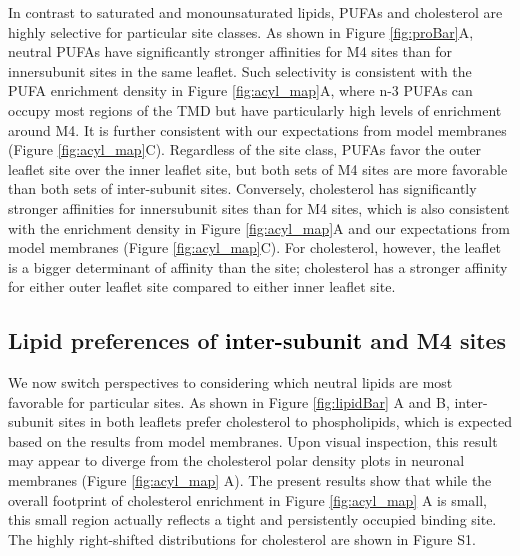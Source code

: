 \documentclass[%
 aip,
 amsmath,amssymb,
 preprint,%
]{revtex4-1}\usepackage{setspace}
\newcommand{\liam}[1]{\textcolor{black}{#1}}
\newcommand{\grace}[1]{\textcolor{black}{{#1}}}
\begin{document}
In contrast to saturated and monounsaturated lipids, PUFAs and cholesterol are highly selective for particular site classes.  As shown in Figure  \ref{fig:proBar}A, neutral PUFAs have significantly stronger affinities for M4 sites than for innersubunit sites in the same leaflet.  Such selectivity is consistent with the PUFA enrichment density in Figure \ref{fig:acyl_map}A, where n-3 PUFAs can occupy most regions of the TMD but have particularly high levels of enrichment around M4. It is further consistent with our expectations from model membranes (Figure \ref{fig:acyl_map}C). Regardless of the site class, PUFAs favor the outer leaflet site over the inner leaflet site, but both sets of M4 sites are more favorable than both sets of inter-subunit sites.  Conversely, cholesterol has significantly stronger affinities for innersubunit sites than for M4 sites, which is also consistent with the enrichment density in Figure \ref{fig:acyl_map}A and our expectations from model membranes (Figure \ref{fig:acyl_map}C). For cholesterol, however, the leaflet is a bigger determinant of affinity than the site; cholesterol has a stronger affinity for either outer leaflet site compared to either inner leaflet site.  

\subsection{Lipid preferences of  \liam{inter-subunit} and M4 sites}
We now switch perspectives to considering which neutral lipids are most favorable for particular sites. As shown in Figure \ref{fig:lipidBar} A and B, inter-subunit sites in both leaflets prefer cholesterol to phospholipids, which is expected based on the results from model membranes.  Upon visual inspection, this result may appear to diverge from the cholesterol polar density plots in neuronal membranes (Figure \ref{fig:acyl_map} A).  The present results show that while the overall footprint of cholesterol enrichment in Figure \ref{fig:acyl_map} A is small, this small region actually reflects a tight and persistently occupied binding site.  The highly right-shifted distributions for cholesterol are shown in Figure S1.  %
\end{document}
